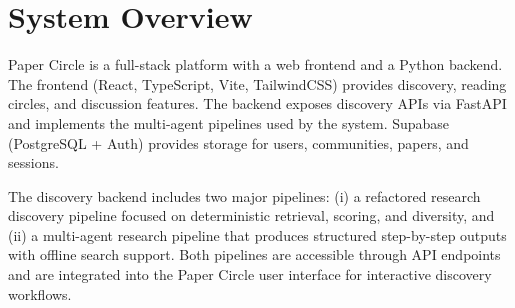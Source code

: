 \section{System Overview}
Paper Circle is a full-stack platform with a web frontend and a Python backend. The frontend (React, TypeScript, Vite, TailwindCSS) provides discovery, reading circles, and discussion features. The backend exposes discovery APIs via FastAPI and implements the multi-agent pipelines used by the system. Supabase (PostgreSQL + Auth) provides storage for users, communities, papers, and sessions.

The discovery backend includes two major pipelines: (i) a refactored research discovery pipeline focused on deterministic retrieval, scoring, and diversity, and (ii) a multi-agent research pipeline that produces structured step-by-step outputs with offline search support. Both pipelines are accessible through API endpoints and are integrated into the Paper Circle user interface for interactive discovery workflows.

